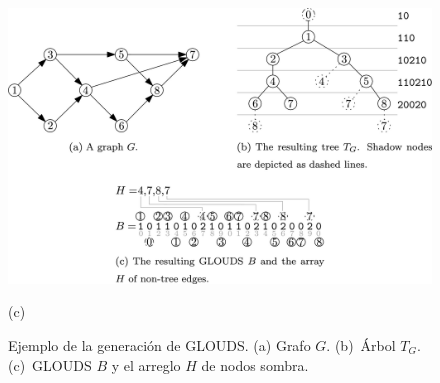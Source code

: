 \begin{figure}
    	\begin{minipage}{\textwidth}
    		\centering
    		\includegraphics[scale=1.8, clip, trim=74 26 76 125]{img/arte/GLOUDS.jpg}
    		
    		(c)
    	\end{minipage}

    \caption{Ejemplo de la generación de GLOUDS. (a) Grafo $G$. (b)~Árbol $T_{G}$. (c)~GLOUDS $B$ y el arreglo $H$ de nodos sombra.}
    \label{fig:GLOUDS}
\end{figure}
